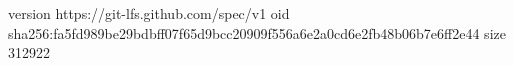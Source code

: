version https://git-lfs.github.com/spec/v1
oid sha256:fa5fd989be29bdbff07f65d9bcc20909f556a6e2a0cd6e2fb48b06b7e6ff2e44
size 312922
